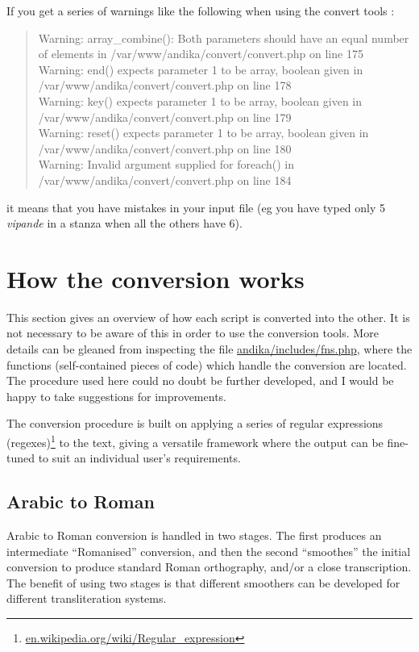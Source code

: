 If you get a series of warnings like the following when using the convert tools :
\begin{quotation}
\noindent Warning: array_combine(): Both parameters should have an equal number of elements in /var/www/andika/convert/convert.php on line 175\\
Warning: end() expects parameter 1 to be array, boolean given in /var/www/andika/convert/convert.php on line 178\\
Warning: key() expects parameter 1 to be array, boolean given in /var/www/andika/convert/convert.php on line 179\\
Warning: reset() expects parameter 1 to be array, boolean given in /var/www/andika/convert/convert.php on line 180\\
Warning: Invalid argument supplied for foreach() in /var/www/andika/convert/convert.php on line 184\\
\end{quotation}
it means that you have mistakes in your input file (eg you have typed only 5 \textit{vipande} in a stanza when all the others have 6).


\section{How the conversion works}

This section gives an overview of how each script is converted into the other.  It is not necessary to be aware of this in order to use the conversion tools.  More details can be gleaned from inspecting the file \url{andika/includes/fns.php}, where the functions (self-contained pieces of code) which handle the conversion are located.  The procedure used here could no doubt be further developed, and I would be happy to take suggestions for improvements.

The conversion procedure  is built on applying a series of regular expressions (regexes)\footnote{\url{en.wikipedia.org/wiki/Regular_expression}} to the text, giving a versatile framework where the output can be fine-tuned to suit an individual user's requirements.

\subsection{Arabic to Roman}

Arabic to Roman conversion is handled in two stages.  The first produces an intermediate ``Romanised'' conversion, and then the second ``smoothes'' the initial conversion to produce standard Roman orthography, and/or a close transcription.  The benefit of using two stages is that different smoothers can be developed for different transliteration systems.

